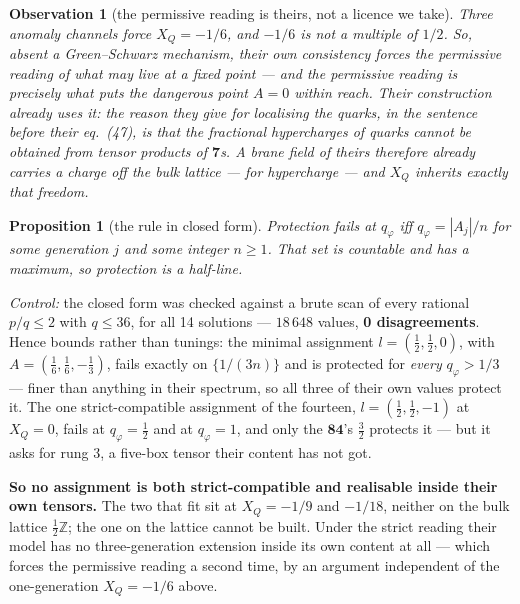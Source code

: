 \documentclass[11pt,a4paper]{article}
\newtheorem{proposition}{Proposition}
\newtheorem{observation}{Observation}
\newcommand{\ZZ}{\mathbb{Z}}
\newcommand{\rep}[1]{\mathbf{#1}}
\newenvironment{keyeq}
  {\begin{center}\setlength{\fboxsep}{9pt}\setlength{\fboxrule}{0.8pt}%
   \begin{lrbox}{\keyeqbox}\begin{minipage}{0.88\textwidth}}
  {\end{minipage}\end{lrbox}%
   \fcolorbox{hdrblue!55}{hdrblue!6}{\usebox{\keyeqbox}}\end{center}}
\begin{document}
\begin{observation}[the permissive reading is theirs, not a licence we take]
Three anomaly channels force $X_Q=-1/6$, and $-1/6$ is not a multiple of $1/2$. So, absent a
Green--Schwarz mechanism, their own consistency forces the \emph{permissive} reading of what may
live at a fixed point --- and the permissive reading is precisely what puts the dangerous point
$A=0$ within reach. Their construction already uses it: the reason they give for localising the
quarks, in the sentence before their eq.~(47), is that the fractional hypercharges of quarks cannot
be obtained from tensor products of $\rep7$s. A brane field of theirs therefore already carries a
charge off the bulk lattice --- for hypercharge --- and $X_Q$ inherits exactly that freedom.
\end{observation}

\begin{proposition}[the rule in closed form]\label{prop:closed}
Protection fails at $q_\varphi$ iff $q_\varphi=|A_j|/n$ for some generation $j$ and some integer
$n\ge1$. That set is countable and has a \emph{maximum}, so protection is a half-line.
\end{proposition}

\emph{Control:} the closed form was checked against a brute scan of every rational $p/q\le2$ with
$q\le36$, for all 14 solutions --- $18\,648$ values, \textbf{0 disagreements}. Hence bounds rather
than tunings: the minimal assignment $l=(\tfrac12,\tfrac12,0)$, with
$A=(\tfrac16,\tfrac16,-\tfrac13)$, fails exactly on $\{1/(3n)\}$ and is protected for \emph{every}
$q_\varphi>1/3$ --- finer than anything in their spectrum, so all three of their own values protect
it. The one strict-compatible assignment of the fourteen, $l=(\tfrac12,\tfrac12,-1)$ at $X_Q=0$,
fails at $q_\varphi=\tfrac12$ and at $q_\varphi=1$, and only the $\rep{84}$'s $\tfrac32$ protects it
--- but it asks for rung $3$, a five-box tensor their content has not got.

\begin{keyeq}
\textbf{So no assignment is both strict-compatible and realisable inside their own tensors.} The two
that fit sit at $X_Q=-1/9$ and $-1/18$, neither on the bulk lattice $\tfrac12\ZZ$; the one on the
lattice cannot be built. Under the strict reading their model has no three-generation extension
inside its own content at all --- which forces the permissive reading a second time, by an argument
independent of the one-generation $X_Q=-1/6$ above.
\end{keyeq}
\end{document}
